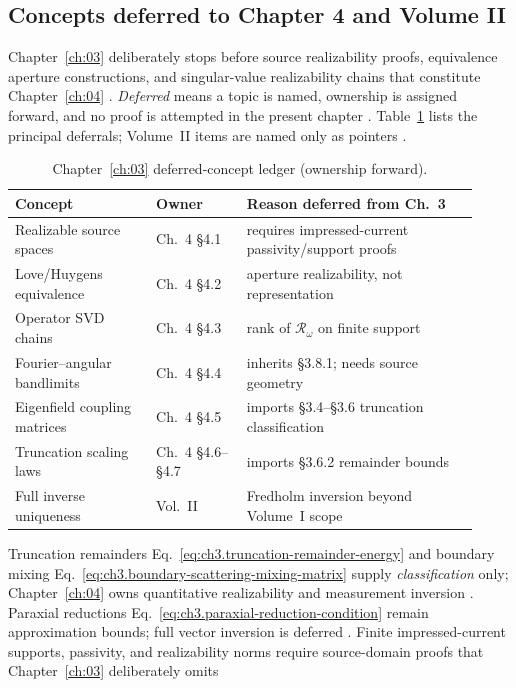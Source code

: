\subsection{Concepts deferred to Chapter 4 and Volume II}
\label{sec:ch3112}
Chapter~\ref{ch:03} deliberately stops before source realizability proofs, equivalence aperture constructions, and
singular-value realizability chains that constitute Chapter~\ref{ch:04} \cite{devaney2004}.
\emph{Deferred} means a topic is named, ownership is assigned forward, and no proof is attempted in the present chapter
\cite{stratton1941}. Table~\ref{tab:ch3.deferred-ledger} lists the principal deferrals; Volume~II items are
named only as pointers \cite{hansen1988}.
\begin{table}[t]
\centering
\caption{Chapter~\ref{ch:03} deferred-concept ledger (ownership forward).}
\label{tab:ch3.deferred-ledger}
\small
\begin{tabular}{@{}p{0.28\linewidth}p{0.18\linewidth}p{0.46\linewidth}@{}}
\toprule
Concept & Owner & Reason deferred from Ch.~3 \\
\midrule
Realizable source spaces & Ch.~4 §4.1 &
requires impressed-current passivity/support proofs \\
Love/Huygens equivalence & Ch.~4 §4.2 &
aperture realizability, not representation \\
Operator SVD chains & Ch.~4 §4.3 &
rank of \(\mathcal{R}_\omega\) on finite support \\
Fourier--angular bandlimits & Ch.~4 §4.4 &
inherits §3.8.1; needs source geometry \\
Eigenfield coupling matrices & Ch.~4 §4.5 &
imports §3.4--§3.6 truncation classification \\
Truncation scaling laws & Ch.~4 §4.6--§4.7 &
imports §3.6.2 remainder bounds \\
Full inverse uniqueness & Vol.~II &
Fredholm inversion beyond Volume~I scope \\
\bottomrule
\end{tabular}
\end{table}
Truncation remainders Eq.~\eqref{eq:ch3.truncation-remainder-energy} and boundary mixing
Eq.~\eqref{eq:ch3.boundary-scattering-mixing-matrix} supply \emph{classification} only; Chapter~\ref{ch:04} owns quantitative
realizability and measurement inversion \cite{harrington2001}. Paraxial reductions
Eq.~\eqref{eq:ch3.paraxial-reduction-condition} remain approximation bounds; full vector inversion is deferred
\cite{allen1992}.
Finite impressed-current supports, passivity, and realizability norms require source-domain proofs that Chapter~\ref{ch:03} deliberately omits
